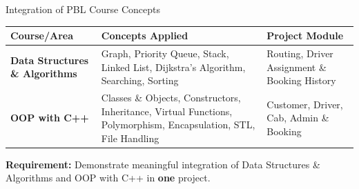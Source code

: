 \documentclass[aspectratio=169,11pt]{beamer}
\begin{document}
\begin{frame}{Integration of PBL Course Concepts}
\scriptsize
\begin{center}
\renewcommand{\arraystretch}{1.25}
\begin{tabularx}{.96\textwidth}{@{}>{\bfseries}p{4.0cm}X p{2.4cm}@{}}
\toprule
Course/Area & Concepts Applied & Project Module\\
\midrule
Data Structures \& Algorithms & Graph, Priority Queue, Stack, Linked List, Dijkstra's Algorithm, Searching, Sorting & Routing, Driver Assignment \& Booking History\\
OOP with C++ & Classes \& Objects, Constructors, Inheritance, Virtual Functions, Polymorphism, Encapsulation, STL, File Handling & Customer, Driver, Cab, Admin \& Booking\\
\bottomrule
\end{tabularx}
\end{center}

\vfill

\begin{center}
\colorbox{GEULightBlue}{\parbox{.86\textwidth}{\centering
\textbf{Requirement:} Demonstrate meaningful integration of Data Structures \& Algorithms and OOP with C++ in \textbf{one} project.}}
\end{center}
\end{frame}
\end{document}
